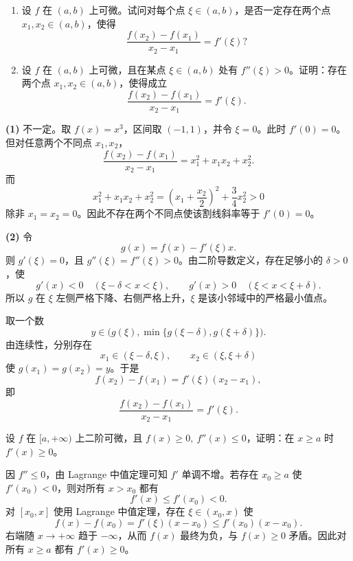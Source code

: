 \begin{xexercise}[12]
\begin{enumerate}[label=(\arabic*)]
  \item 设 $f$ 在 $(a,b)$ 上可微。试问对每个点 $\xi\in(a,b)$，是否一定存在两个点 $x_1,x_2\in(a,b)$，使得
  \[
    \frac{f(x_2)-f(x_1)}{x_2-x_1}=f'(\xi)?
  \]
  \item 设 $f$ 在 $(a,b)$ 上可微，且在某点 $\xi\in(a,b)$ 处有 $f''(\xi)>0$。证明：存在两个点 $x_1,x_2\in(a,b)$，使得成立
  \[
    \frac{f(x_2)-f(x_1)}{x_2-x_1}=f'(\xi).
  \]
\end{enumerate}
\end{xexercise}
\begin{xsolution}
\textbf{(1)}\quad
不一定。取 $f(x)=x^3$，区间取 $(-1,1)$，并令 $\xi=0$。此时 $f'(0)=0$。但对任意两个不同点 $x_1,x_2$，
\[
  \frac{f(x_2)-f(x_1)}{x_2-x_1}
  =x_1^2+x_1x_2+x_2^2.
\]
而
\[
  x_1^2+x_1x_2+x_2^2
  =\left(x_1+\frac{x_2}{2}\right)^2+\frac34x_2^2>0
\]
除非 $x_1=x_2=0$。因此不存在两个不同点使该割线斜率等于 $f'(0)=0$。

\textbf{(2)}\quad
令
\[
  g(x)=f(x)-f'(\xi)x.
\]
则 $g'(\xi)=0$，且 $g''(\xi)=f''(\xi)>0$。由二阶导数定义，存在足够小的 $\delta>0$，使
\[
  g'(x)<0\quad(\xi-\delta<x<\xi),
  \qquad
  g'(x)>0\quad(\xi<x<\xi+\delta).
\]
所以 $g$ 在 $\xi$ 左侧严格下降、右侧严格上升，$\xi$ 是该小邻域中的严格最小值点。

取一个数
\[
  y\in\bigl(g(\xi),\min\{g(\xi-\delta),g(\xi+\delta)\}\bigr).
\]
由连续性，分别存在
\[
  x_1\in(\xi-\delta,\xi),
  \qquad
  x_2\in(\xi,\xi+\delta)
\]
使 $g(x_1)=g(x_2)=y$。于是
\[
  f(x_2)-f(x_1)=f'(\xi)(x_2-x_1),
\]
即
\[
  \frac{f(x_2)-f(x_1)}{x_2-x_1}=f'(\xi).
\]
\end{xsolution}


\begin{xexercise}[13]
设 $f$ 在 $[a,+\infty)$ 上二阶可微，且 $f(x)\geqslant0,\ f''(x)\leqslant0$，证明：在 $x\geqslant a$ 时 $f'(x)\geqslant0$。
\end{xexercise}
\begin{xsolution}
因 $f''\leqslant0$，由 Lagrange 中值定理可知 $f'$ 单调不增。若存在 $x_0\geqslant a$ 使 $f'(x_0)<0$，则对所有 $x>x_0$ 都有
\[
  f'(x)\leqslant f'(x_0)<0.
\]
对 $[x_0,x]$ 使用 Lagrange 中值定理，存在 $\xi\in(x_0,x)$ 使
\[
  f(x)-f(x_0)=f'(\xi)(x-x_0)
  \leqslant f'(x_0)(x-x_0).
\]
右端随 $x\to+\infty$ 趋于 $-\infty$，从而 $f(x)$ 最终为负，与 $f(x)\geqslant0$ 矛盾。因此对所有 $x\geqslant a$ 都有 $f'(x)\geqslant0$。
\end{xsolution}


